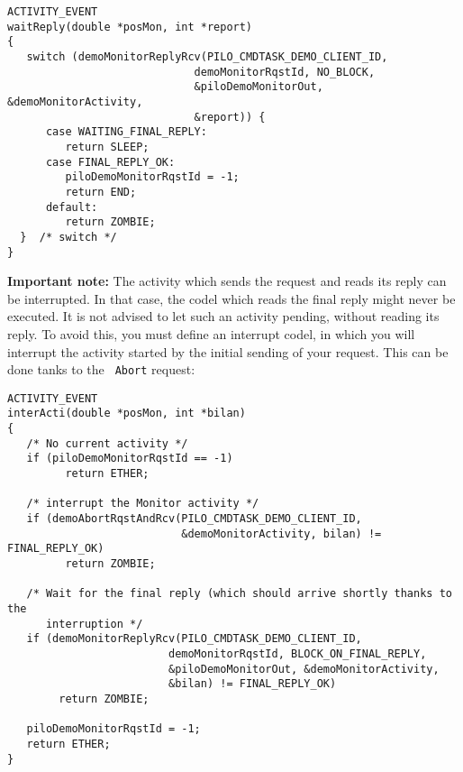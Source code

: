 \begin{center}\begin{cartouche}\small\begin{verbatim}
ACTIVITY_EVENT
waitReply(double *posMon, int *report)
{
   switch (demoMonitorReplyRcv(PILO_CMDTASK_DEMO_CLIENT_ID, 
                             demoMonitorRqstId, NO_BLOCK,
                             &piloDemoMonitorOut, &demoMonitorActivity, 
                             &report)) {
      case WAITING_FINAL_REPLY:
         return SLEEP;
      case FINAL_REPLY_OK:
         piloDemoMonitorRqstId = -1;
         return END;
      default:
         return ZOMBIE;
  }  /* switch */
}
\end{verbatim}\end{cartouche}\end{center}

{\bf Important note:} The activity which sends  the request and reads its
reply can be interrupted.  In that case,  the codel which reads the final
reply might never be executed. It is not advised  to let such an activity
pending, without reading its reply.   To avoid this,  you must define  an
interrupt codel, in which you will  interrupt the activity started by the
initial  sending of your request.  This  can  be done  tanks  to the {\tt
Abort} request:

\begin{center}\begin{cartouche}\small\begin{verbatim}
ACTIVITY_EVENT
interActi(double *posMon, int *bilan)
{
   /* No current activity */
   if (piloDemoMonitorRqstId == -1)
         return ETHER;

   /* interrupt the Monitor activity */
   if (demoAbortRqstAndRcv(PILO_CMDTASK_DEMO_CLIENT_ID, 
                           &demoMonitorActivity, bilan) != FINAL_REPLY_OK)
         return ZOMBIE;

   /* Wait for the final reply (which should arrive shortly thanks to the
      interruption */
   if (demoMonitorReplyRcv(PILO_CMDTASK_DEMO_CLIENT_ID, 
                         demoMonitorRqstId, BLOCK_ON_FINAL_REPLY,
                         &piloDemoMonitorOut, &demoMonitorActivity, 
                         &bilan) != FINAL_REPLY_OK)
        return ZOMBIE;

   piloDemoMonitorRqstId = -1;
   return ETHER;
}
\end{verbatim}\end{cartouche}\end{center}



